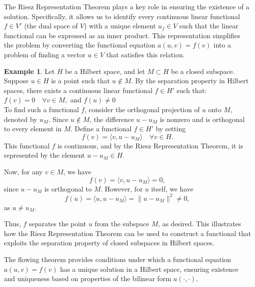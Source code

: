 \documentclass[12pt, reqno]{amsart}
\theoremstyle{definition}
\newtheorem{example}[theorem]{Example}
\numberwithin{equation}{section}
\begin{document}
The Riesz Representation Theorem plays a key role in ensuring the existence of a solution. Specifically, it allows us to identify every continuous linear functional $f \in V'$ (the dual space of $V$) with a unique element $u_f \in V$ such that the linear functional can be expressed as an inner product. This representation simplifies the problem by converting the functional equation $a(u, v) = f(v)$ into a problem of finding a vector $u \in V$ that satisfies this relation.
\begin{example}
Let \( H \) be a Hilbert space, and let \( M \subset H \) be a closed subspace. Suppose \( u \in H \) is a point such that \( u \notin M \). By the separation property in Hilbert spaces, there exists a continuous linear functional \( f \in H' \) such that: $f(v) = 0 \quad \forall v \in M,$
and
$f(u) \neq 0$ \\

To find such a functional \( f \), consider the orthogonal projection of \( u \) onto \( M \), denoted by \( u_M \). Since \( u \notin M \), the difference \( u - u_M \) is nonzero and is orthogonal to every element in \( M \). Define a functional \( f \in H' \) by setting
\[
f(v) = \langle v, u - u_M \rangle \quad \forall v \in H.
\]
This functional \( f \) is continuous, and by the Riesz Representation Theorem, it is represented by the element \( u - u_M \in H \).

Now, for any \( v \in M \), we have
\[
f(v) = \langle v, u - u_M \rangle = 0,
\]
since \( u - u_M \) is orthogonal to \( M \). However, for \( u \) itself, we have
\[
f(u) = \langle u, u - u_M \rangle = \|u - u_M\|^2 \neq 0,
\]
as \( u \neq u_M \).

Thus, \( f \) separates the point \( u \) from the subspace \( M \), as desired. This illustrates how the Riesz Representation Theorem can be used to construct a functional that exploits the separation property of closed subspaces in Hilbert spaces.
\end{example}

The flowing theorem provides conditions under which a functional equation \( a(u, v) = f(v) \) has a unique solution in a Hilbert space, ensuring existence and uniqueness based on properties of the bilinear form \( a(\cdot, \cdot) \).
\end{document}
